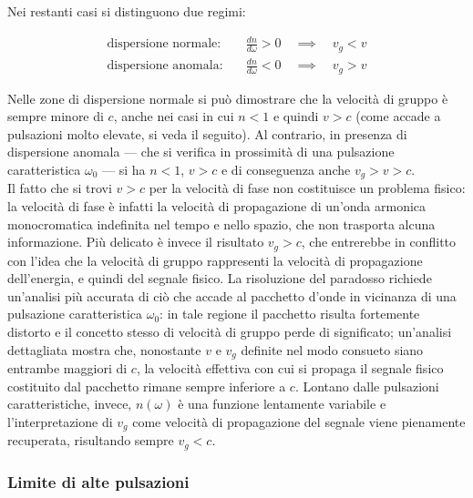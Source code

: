 \newpage

Nei restanti casi si distinguono due regimi:

\begin{tcolorbox}[colback=yellow!10!white, colframe=orange!70!black, boxrule=0.8pt]
\begin{align}
    \text{dispersione normale:} \quad & \frac{dn}{d\omega} > 0 \quad \implies \quad v_g < v \\[0.3em]
    \text{dispersione anomala:} \quad & \frac{dn}{d\omega} < 0 \quad \implies \quad v_g > v
\end{align}
\end{tcolorbox}

Nelle zone di dispersione normale si può dimostrare che la velocità di gruppo è sempre minore di $c$, anche nei casi in cui $n<1$ e quindi $v>c$ (come accade a pulsazioni molto elevate, si veda il seguito). Al contrario, in presenza di dispersione anomala --- che si verifica in prossimità di una pulsazione caratteristica $\omega_0$ --- si ha $n<1$, $v>c$ e di conseguenza anche $v_g > v > c$.\\

Il fatto che si trovi $v > c$ per la velocità di fase non costituisce un problema fisico: la velocità di fase è infatti la velocità di propagazione di un'onda armonica monocromatica indefinita nel tempo e nello spazio, che non trasporta alcuna informazione. Più delicato è invece il risultato $v_g > c$, che entrerebbe in conflitto con l'idea che la velocità di gruppo rappresenti la velocità di propagazione dell'energia, e quindi del segnale fisico. La risoluzione del paradosso richiede un'analisi più accurata di ciò che accade al pacchetto d'onde in vicinanza di una pulsazione caratteristica $\omega_0$: in tale regione il pacchetto risulta fortemente distorto e il concetto stesso di velocità di gruppo perde di significato; un'analisi dettagliata mostra che, nonostante $v$ e $v_g$ definite nel modo consueto siano entrambe maggiori di $c$, la velocità effettiva con cui si propaga il segnale fisico costituito dal pacchetto rimane sempre inferiore a $c$. Lontano dalle pulsazioni caratteristiche, invece, $n(\omega)$ è una funzione lentamente variabile e l'interpretazione di $v_g$ come velocità di propagazione del segnale viene pienamente recuperata, risultando sempre $v_g < c$.\\

\subsubsection*{Limite di alte pulsazioni}

